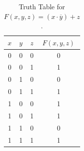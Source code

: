 \begin{table}[h!]
        \begin{center}
        \renewcommand{\arraystretch}{1.5} %
        \begin{tabular}{c|c|c|c}
        $x$ & $y$ & $z$ & $F(x, y, z)$ \\
        \hline
        0 & 0 & 0 & 0 \\
        \rowcolor{gray!20}
        0 & 0 & 1 & 1 \\
        0 & 1 & 0 & 0 \\
        \rowcolor{gray!20}
        0 & 1 & 1 & 1 \\
        1 & 0 & 0 & 1 \\
        \rowcolor{gray!20}
        1 & 0 & 1 & 1 \\
        1 & 1 & 0 & 0 \\
        \rowcolor{gray!20}
        1 & 1 & 1 & 1 \\
        \end{tabular}
        \end{center}
    \caption{Truth Table for $F(x, y, z) = (x \cdot \overline{y}) + z$.}
    \label{tab:ttexam}
\end{table}

